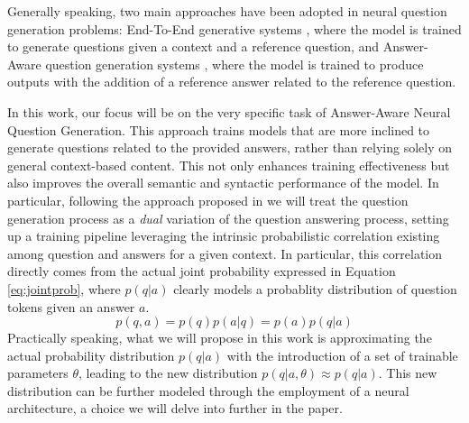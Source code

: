 \documentclass{article}
\begin{document}
Generally speaking, two main approaches have been adopted in neural question generation problems: End-To-End generative systems \cite{RODRIGUEZTORREALBA2022118258}, where the model is trained to generate questions given a context and a reference question, and Answer-Aware question generation systems \cite{sun-etal-2018-answer}, where the model is trained to produce outputs with the addition of a reference answer related to the reference question.

In this work, our focus will be on the very specific task of Answer-Aware Neural Question Generation. This approach trains models that are more inclined to generate questions related to the provided answers, rather than relying solely on general context-based content. This not only enhances training effectiveness but also improves the overall semantic and syntactic performance of the model. In particular, following the approach proposed in \cite{tang2017question} we will treat the question generation process as a \textit{dual} variation of the question answering process, setting up a training pipeline leveraging the intrinsic probabilistic correlation existing among question and answers for a given context. In particular, this correlation directly comes from the actual joint probability expressed in Equation \ref{eq:jointprob}, where $p(q|a)$ clearly models a probablity distribution of question tokens given an answer $a$. 
\begin{equation}
    p(q, a) = p(q)p(a \vert q) = p(a)p(q \vert a)
    \label{eq:jointprob}
\end{equation}
Practically speaking, what we will propose in this work is approximating the actual probability distribution \( p(q|a) \) with the introduction of a set of trainable parameters \( \theta \), leading to the new distribution \( p(q \vert a, \theta) \approx p(q \vert a) \). This new distribution can be further modeled through the employment of a neural architecture, a choice we will delve into further in the paper.
\end{document}
